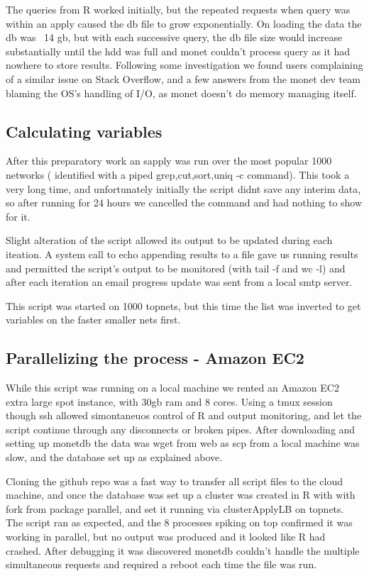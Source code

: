 \documentclass[12pt]{article}
\begin{document}
		The queries from R worked initially, but the repeated requests when query was within an apply caused the db file to grow exponentially.
		On loading the data the db was ~14 gb, but with each successive query, the db file size would increase substantially until the hdd was full and monet couldn't process query as it had nowhere to store results.
		Following some investigation we found users complaining of a similar issue on Stack Overflow, and a few answers from the monet dev team blaming the OS's handling of I/O, as monet doesn't do memory managing itself. 



		\subsection{Calculating variables}
		After this preparatory work an sapply was run over the most popular 1000 networks ( identified with a piped grep,cut,sort,uniq -c command).
		This took a very long time, and unfortunately initially the script didnt save any interim data, so after running for 24 hours we cancelled the command and had nothing to show for it.


		Slight alteration of the script allowed its output to be updated during each iteation.
		A system call to echo appending results to a file gave us running results and permitted the script's output to be monitored (with tail -f and wc -l) and after each iteration an email progress update was sent from a local smtp server.


		This script was started on 1000 topnets, but this time the list was inverted to get variables on the faster smaller nets first.

		\subsection{Parallelizing the process - Amazon EC2}
		While this script was running on a local machine we rented an Amazon EC2 extra large spot instance, with 30gb ram and 8 cores.
		Using a tmux session though ssh allowed simontaneuos control of R and output monitoring, and let the script continue through any disconnects or broken pipes.
		After downloading and setting up monetdb the data was wget from web as scp from a local machine was slow, and the database set up as explained above.


		Cloning the github repo was a fast way to transfer all script files to the cloud machine, and once the database was set up a cluster was created in R with with fork from package parallel, and set it running via clusterApplyLB on topnets.
		The script ran as expected, and the 8 processes spiking on top confirmed it was working in parallel, but no output was produced and it looked like R had crashed.
		After debugging it was discovered monetdb couldn't handle the multiple simultaneous requests and required a reboot each time the file was run. 
\end{document}
